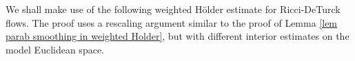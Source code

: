 \documentclass[12pt]{amsart}
\renewcommand{\1}{{\mathbf 1}}
\newcommand{\R}{{\mathbb R}}
\theoremstyle{others}
\numberwithin{equation}{section}
\begin{document}







We shall make use of the following weighted H{\"o}lder estimate for Ricci-DeTurck flows.
The proof uses a rescaling argument similar to the proof of Lemma \ref{lem parab smoothing in weighted Holder}, but with different interior estimates on the model Euclidean space.
\end{document}
